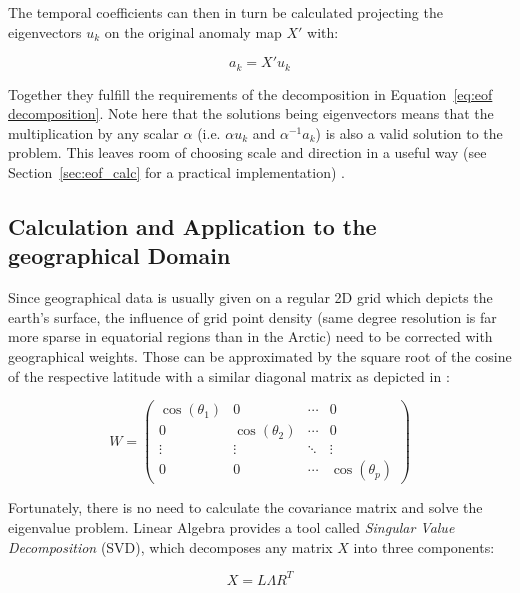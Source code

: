 The temporal coefficients can then in turn be calculated projecting the eigenvectors $u_k$ on the original anomaly map $X'$ with: 

\begin{equation}
  a_{k} = X'u_k
\end{equation}

Together they fulfill the requirements of the decomposition in Equation~\ref{eq:eof decomposition}. 
Note here that the solutions being eigenvectors means that the multiplication by any scalar $\alpha$ (i.e. $\alpha u_k$ and $\alpha^{-1} a_k$) is also a valid solution to the problem. 
This leaves room of choosing scale and direction in a useful way (see Section~\ref{sec:eof_calc} for a practical implementation) \cite{vietinghoffdiss}. 

\subsection{Calculation and Application to the geographical Domain}


Since geographical data is usually given on a regular 2D grid which depicts the earth's surface, the influence of grid point density (same degree resolution is far more sparse in equatorial regions than in the Arctic) need to be corrected with geographical weights. 
Those can be approximated by the square root of the cosine of the respective latitude \cite{hannachi_primer_nodate, vietinghoffdiss} with a similar diagonal matrix as depicted in \cite{hannachi_primer_nodate}: 

\begin{equation}
  W = \begin{pmatrix}
    \cos(\theta_1) & 0 & \cdots & 0 \\
0 & \cos(\theta_2) & \cdots & 0 \\
\vdots & \vdots & \ddots & \vdots \\
0 & 0 & \cdots & \cos(\theta_p)
\end{pmatrix}
  \label{eq:geographical weighting}
\end{equation}
  

Fortunately, there is no need to calculate the covariance matrix and solve the eigenvalue problem. 
Linear Algebra provides a tool called \textit{Singular Value Decomposition} (SVD), which decomposes any matrix $X$ into three components: 

\begin{equation}
  X = L \Lambda R^T 
  \label{eq:svd definition}
\end{equation}

